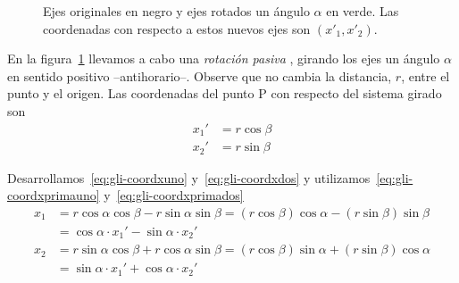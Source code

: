 \begin{figure}[ht]
\begin{minipage}{0.45\linewidth}
    \caption{Ejes originales en negro y ejes rotados un ángulo $\alpha$ en verde. Las coordenadas con respecto a estos nuevos ejes son $(x'_1,x'_2)$.}
    \label{fig:gli-rotated_axes}
  \end{minipage}
\end{figure}

En la figura~\ref{fig:gli-rotated_axes} llevamos a cabo una \emph{rotación pasiva} \footnotemark{}, girando los ejes un ángulo $\alpha$ en sentido positivo --antihorario--.
Observe que no cambia la distancia, $r$, entre el punto y el origen.
Las coordenadas del punto P con respecto del sistema girado son
\begin{subequations}
  \begin{align}\label{eq:gli-coordxprimauno}
    x_1' &= r \cos\beta\\
    \label{eq:gli-coordxprimados}
    x_2' &= r \sin\beta
  \end{align}
\end{subequations}

Desarrollamos~\eqref{eq:gli-coordxuno} y~\eqref{eq:gli-coordxdos} y  utilizamos~\eqref{eq:gli-coordxprimauno} y~\eqref{eq:gli-coordxprimados}
\begin{align*}
  x_1 &= r \cos\alpha \cos\beta - r \sin\alpha \sin\beta
        = (r\cos\beta)\cos\alpha - (r\sin\beta)\sin\beta\\
        &= \cos\alpha\cdot x_1' - \sin\alpha \cdot x_2'\\
  x_2 &= r \sin\alpha \cos\beta + r \cos\alpha \sin\beta
        = (r \cos\beta)\sin\alpha + (r \sin\beta)\cos\alpha\\
        &= \sin\alpha \cdot x_1' + \cos\alpha \cdot  x_2'
\end{align*}

